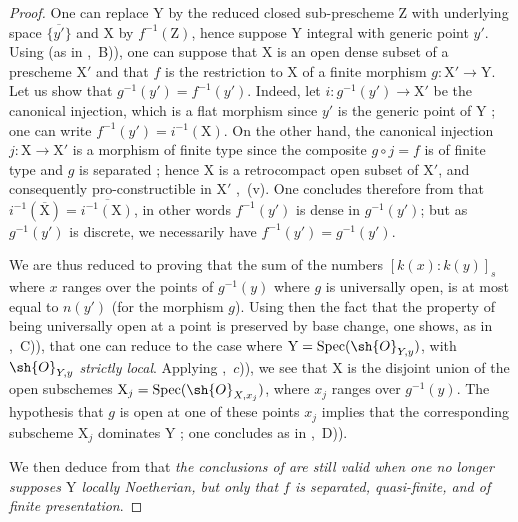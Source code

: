 \begin{proof}
One can replace $\mathrm{Y}$ by the reduced closed sub-prescheme $\mathrm{Z}$ with underlying space $\overline{\{y'\}}$ and $\mathrm{X}$ by $f^{-1}(\mathrm{Z})$, hence suppose $\mathrm{Y}$ integral with generic point $y'$.
Using  (as in ,~B)), one can suppose that $\mathrm{X}$ is an open dense subset of a prescheme $\mathrm{X}'$ and that $f$ is the restriction to $\mathrm{X}$ of a finite morphism $g:\mathrm{X}'\to\mathrm{Y}$.
Let us show that $g^{-1}(y')=f^{-1}(y')$.
Indeed, let $i:g^{-1}(y')\to\mathrm{X}'$ be the canonical injection, which is a flat morphism since $y'$ is the generic point of $\mathrm{Y}$ ; one can write $f^{-1}(y')=i^{-1}(\mathrm{X})$.
On the other hand, the canonical injection $j:\mathrm{X}\to\mathrm{X}'$ is a morphism of finite type since the composite $g\circ j=f$ is of finite type and $g$ is separated ; hence $\mathrm{X}$ is a retrocompact open subset of $\mathrm{X}'$, and consequently pro-constructible in $\mathrm{X}'$ ,~(v).
One concludes therefore from  that $i^{-1}(\overline{\mathrm{X}})=\overline{i^{-1}(\mathrm{X})}$, in other words $f^{-1}(y')$ is dense in $g^{-1}(y')$; but as $g^{-1}(y')$ is discrete, we necessarily have $f^{-1}(y')=g^{-1}(y')$.

We are thus reduced to proving that the sum of the numbers $[k(x):k(y)]_s$ where $x$ ranges over the points of $g^{-1}(y)$ where $g$ is universally open, is at most equal to
$n(y')$ (for the morphism $g$).
Using then the fact that the property of being universally open at a point is preserved by base change, one shows, as in ,~C)), that one can reduce to the case where $\mathrm{Y}=\operatorname{Spec}(\sh{O}_{Y,y})$, with $\sh{O}_{Y,y}$ \emph{strictly local}.
Applying ,~$c$)), we see that $\mathrm{X}$ is the disjoint union of the open subschemes $\mathrm{X}_j=\operatorname{Spec}(\sh{O}_{X,x_j})$, where $x_j$ ranges over $g^{-1}(y)$. The hypothesis that $g$ is open at one of these points $x_j$ implies that the corresponding subscheme $\mathrm{X}_j$ dominates $\mathrm{Y}$ ; one concludes as in ,~D)).

We then deduce from  that \emph{the conclusions of  are still valid when one no longer supposes $\mathrm{Y}$ locally Noetherian, but only that $f$ is separated, quasi-finite, and of finite presentation}.
\end{proof}

